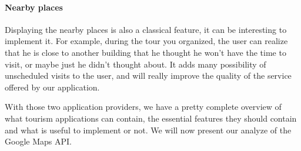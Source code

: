\paragraph{Nearby places} Displaying the nearby places is also a classical feature, it can be interesting to implement it. For example, during the tour you organized, the user can realize that he is close to another building that he thought he won't have the time to visit, or maybe just he didn't thought about. It adds many possibility of unscheduled visits to the user, and will really improve the quality of the service offered by our application.

With those two application providers, we have a pretty complete overview of what tourism applications can contain, the essential features they should contain and what is useful to implement or not. We will now present our analyze of the Google Maps API.





